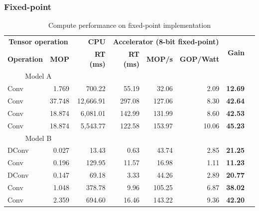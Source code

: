 \subsubsection{Fixed-point}
\begin{table}[!htp]\centering
	\caption{Compute performance on fixed-point implementation}\label{tab:performance_fixed_point }
	\scriptsize
	\begin{tabular}{lrrrrrrr}\toprule
		\multicolumn{2}{c}{\textbf{Tensor operation}} &\textbf{CPU} &\multicolumn{3}{c}{\textbf{Accelerator (8-bit fixed-point)}} &\multirow{2}{*}{\textbf{Gain}} \\\cmidrule{1-6}
		\textbf{Operation} &\textbf{MOP} &\textbf{RT (ms)} &\textbf{RT (ms)} &\textbf{MOP/s} &\textbf{GOP/Watt} & \\\midrule
		\multicolumn{2}{c}{Model A} & & & & & \\
		Conv &1.769 &700.22 &55.19 &32.06 &2.09 &\textbf{12.69} \\
		Conv &37.748 &12,666.91 &297.08 &127.06 &8.30 &\textbf{42.64} \\
		Conv &18.874 &6,081.01 &142.99 &131.99 &8.60 &\textbf{42.53} \\
		Conv &18.874 &5,543.77 &122.58 &153.97 &10.06 &\textbf{45.23} \\
		\multicolumn{2}{c}{Model B} & & & & & \\
		DConv &0.027 &13.43 &0.63 &43.74 &2.85 &\textbf{21.25} \\
		Conv &0.196 &129.95 &11.57 &16.98 &1.11 &\textbf{11.23} \\
		DConv &0.147 &69.18 &3.33 &44.26 &2.89 &\textbf{20.77} \\
		Conv &1.048 &378.78 &9.96 &105.25 &6.87 &\textbf{38.02} \\
		Conv &2.359 &694.60 &16.46 &143.22 &9.36 &\textbf{42.20} \\
		\bottomrule
	\end{tabular}
\end{table}

